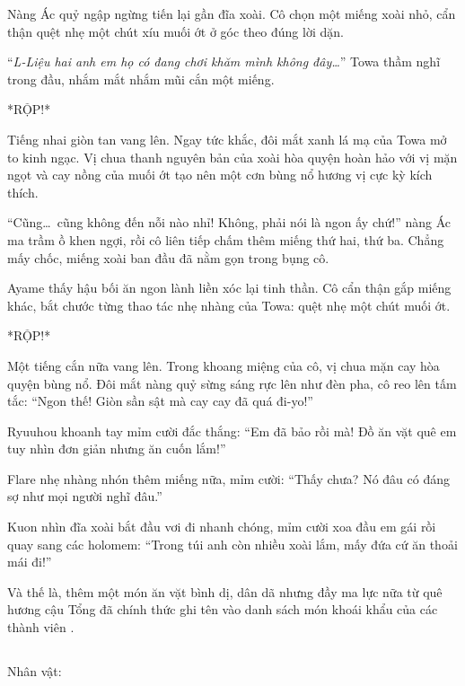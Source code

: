 \documentclass[../main.tex]{subfiles}
\begin{document}
Nàng Ác quỷ ngập ngừng tiến lại gần đĩa xoài. Cô chọn một miếng xoài nhỏ, cẩn thận quệt nhẹ một chút xíu muối ớt ở góc theo đúng lời dặn.

``\textit{L-Liệu hai anh em họ có đang chơi khăm mình không đây\dots}'' Towa thầm nghĩ trong đầu, nhắm mắt nhắm mũi cắn một miếng.

*RỘP!*

Tiếng nhai giòn tan vang lên. Ngay tức khắc, đôi mắt xanh lá mạ của Towa mở to kinh ngạc. Vị chua thanh nguyên bản của xoài hòa quyện hoàn hảo với vị mặn ngọt và cay nồng của muối ớt tạo nên một cơn bùng nổ hương vị cực kỳ kích thích.

``Cũng\dots\ cũng không đến nỗi nào nhỉ! Không, phải nói là ngon ấy chứ!'' nàng Ác ma trầm ồ khen ngợi, rồi cô liên tiếp chấm thêm miếng thứ hai, thứ ba. Chẳng mấy chốc, miếng xoài ban đầu đã nằm gọn trong bụng cô.

Ayame thấy hậu bối ăn ngon lành liền xóc lại tinh thần. Cô cẩn thận gắp miếng khác, bắt chước từng thao tác nhẹ nhàng của Towa: quệt nhẹ một chút muối ớt.

*RỘP!*

Một tiếng cắn nữa vang lên. Trong khoang miệng của cô, vị chua mặn cay hòa quyện bùng nổ. Đôi mắt nàng quỷ sừng sáng rực lên như đèn pha, cô reo lên tấm tắc: ``Ngon thế! Giòn sần sật mà cay cay đã quá đi-yo!''

Ryuuhou khoanh tay mỉm cười đắc thắng: ``Em đã bảo rồi mà! Đồ ăn vặt quê em tuy nhìn đơn giản nhưng ăn cuốn lắm!''

Flare nhẹ nhàng nhón thêm miếng nữa, mỉm cười: ``Thấy chưa? Nó đâu có đáng sợ như mọi người nghĩ đâu.''

Kuon nhìn đĩa xoài bắt đầu vơi đi nhanh chóng, mỉm cười xoa đầu em gái rồi quay sang các holomem: ``Trong túi anh còn nhiều xoài lắm, mấy đứa cứ ăn thoải mái đi!''

Và thế là, thêm một món ăn vặt bình dị, dân dã nhưng đầy ma lực nữa từ quê hương cậu Tổng đã chính thức ghi tên vào danh sách món khoái khẩu của các thành viên \hll.

\newpage

\subsection*{\label{ep-C9.III}}
\vspace{-4pt}
\begin{center}
  {\caviar\fontsize{12pt}{12pt}\selectfont Nhân vật:    }
\end{center}
\end{document}
